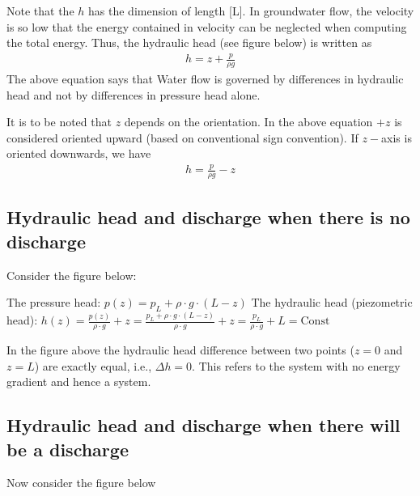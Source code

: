 \documentclass[letterpaper,10pt,english]{jupyterBook}
\let\sphinxpxdimen\pdfpxdimen\else\newdimen\sphinxpxdimen
\begin{document}
\sphinxAtStartPar
Note that the \(h\) has the dimension of length {[}L{]}.  In groundwater flow, the velocity is so low
that the energy contained in velocity can be neglected when computing the total energy.
Thus, the hydraulic head (see figure below) is written as
\begin{equation*}
\begin{split}
h = z + \frac{p}{\rho g} 
\end{split}
\end{equation*}
\sphinxAtStartPar
The above equation says that Water flow is governed by differences in hydraulic head and not by differences in pressure head alone.

\sphinxAtStartPar
It is to be noted that \(z\) depends on the orientation. In the above equation \(+z\) is considered oriented upward (based on conventional sign convention). If \(z-\)axis is oriented downwards, we have
\begin{equation*}
\begin{split}
h = \frac{p}{\rho g}-z 
\end{split}
\end{equation*}

\subsection{Hydraulic head and discharge \sphinxhyphen{} when there is no discharge}
\label{\detokenize{content/flow/L4/14_darcy_law_K:hydraulic-head-and-discharge-when-there-is-no-discharge}}
\sphinxAtStartPar
Consider the figure below:

\noindent{\hspace*{\fill}\sphinxincludegraphics[height=400\sphinxpxdimen]{{L4_f1}.png}\hspace*{\fill}}

\sphinxAtStartPar
The pressure head: \(p(z) = p_L + \rho \cdot g \cdot (L-z)\) 
The hydraulic head (piezometric head): \(h(z) = \frac{p(z)}{\rho \cdot g } + z = \frac{p_L + \rho \cdot g \cdot (L-z) }{\rho \cdot g } + z = \frac{p_L}{\rho \cdot g}+ L = \text{Const}\)

\sphinxAtStartPar
In the figure above the hydraulic head difference between two points (\(z=0\) and \(z=L\)) are exactly equal, i.e., \(\Delta h = 0\). This refers to the system with no energy gradient and hence a  system.


\subsection{Hydraulic head and discharge \sphinxhyphen{} when there will be a discharge}
\label{\detokenize{content/flow/L4/14_darcy_law_K:hydraulic-head-and-discharge-when-there-will-be-a-discharge}}
\sphinxAtStartPar
Now consider the figure below
\end{document}
